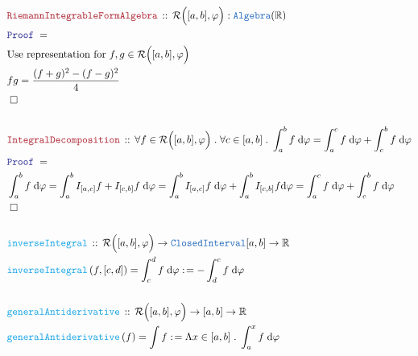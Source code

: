 \documentclass[12pt]{scrartcl}
\newcommand{\TYPE}[1]{\textcolor{NavyBlue}{\mathtt{#1}}}
\newcommand{\FUNC}[1]{\textcolor{Cerulean}{\mathtt{#1}}}
\newcommand{\LOGIC}[1]{\textcolor{Blue}{\mathtt{#1}}}
\newcommand{\THM}[1]{\textcolor{Maroon}{\mathtt{#1}}}
\renewcommand{\.}{\; . \;}
\newcommand{\de}{: \kern 0.1pc =}
\newcommand{\Act}[1]{\left( #1 \right)}
\newcommand{\Theorem}[2]{& \THM{#1} \, :: \, #2 \\ & \Proof = \\ }
\newcommand{\DeclareFunc}[2]{& \FUNC{#1} \, :: \, #2 \\}
\newcommand{\DefineNamedFunc}[4]{&  \FUNC{#1}\Act{#2} = #3 \de #4 \\}
\newcommand{\Page}[1]{ \begin{align*} #1 \end{align*}   }
\newcommand{\Reals}{\mathbb{R} }
\newcommand{\QED}{\; \square}
\newcommand{\EndProof}{& \QED \\}
\newcommand{\Proof}{\LOGIC{Proof} \; }
\begin{document}
\Page{
	\Theorem{RiemannIntegrableFormAlgebra}
	{  \mathcal{R}\Big( [a,b], \varphi \Big) : \TYPE{Algebra}(\Reals) }
	& \text{Use representation for $f,g \in \mathcal{R}\Big([a,b],\varphi\Big)$} \\
	&   fg = \frac{(f + g)^2 - (f - g)^2}{4} \\ 
	\EndProof
	\\
	\Theorem{IntegralDecomposition}
	{ \forall f \in \mathcal{R}\Big( [a,b], \varphi \Big) \. \forall c \in [a,b] \.                 
		\int^b_a f \; \mathrm{d} \varphi = \int^c_a f \; \mathrm{d} \varphi + \int^b_c f \; \mathrm{d} \varphi 
	}
        & \int^b_a f\; \mathrm{d} \varphi  = \int^b_a I_{[a,c]}f + I_{[c,b]}f \; \mathrm{d} \varphi  = 
	\int^b_a I_{[a,c]} f \; \mathrm{d} \varphi + \int^b_a I_{[c,b]}f \mathrm{d} \varphi = 
	\int^c_a f \; \mathrm{d} \varphi + \int^b_c f \; \mathrm{d} \varphi \\
	\EndProof
	\\
	\DeclareFunc{inverseIntegral}{\mathcal{R}\Big([a,b],\varphi\Big) \to \TYPE{ClosedInterval}[a,b] \to \Reals}
	\DefineNamedFunc{inverseIntegral}{ f, [c,d]  }{\int^d_c f \; \mathrm{d} \varphi}
	{ - \int^c_d f \; \mathrm{d} \varphi  }
	\\
	\DeclareFunc{generalAntiderivative}{\mathcal{R}\Big([a,b],\varphi\Big) \to [a,b] \to \Reals}
	\DefineNamedFunc{generalAntiderivative}{f}{\int f}{\Lambda x \in [a,b] \. \int^x_a f \; \mathrm{d} \varphi}
}
\newpage
\end{document}
